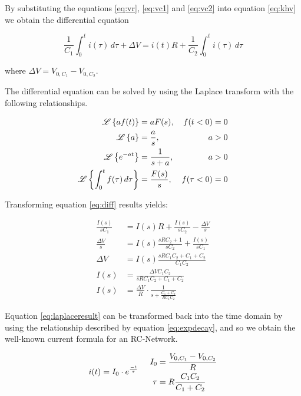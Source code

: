 By substituting the equations  \ref{eq:vr}, \ref{eq:vc1} and \ref{eq:vc2} into
equation \ref{eq:khv} we obtain the differential equation

\begin{equation}
    \frac{1}{C_1}\int_0^t i(\tau)\,d\tau + \Delta V = i(t)R + \frac{1}{C_2}\int_0^t i(\tau)\,d\tau
    \label{eq:diff}
\end{equation}

where $\Delta V = V_{0,C_1} - V_{0,C_2}$.

The differential  equation  can  be solved by using the Laplace transform with
the following relationships.

\begin{align}
    \mathscr{L}\left\{af(t)\right\} &= aF(s), & f(t<0)=0 \\
    \mathscr{L}\left\{a\right\} &= \frac{a}{s}, & a > 0 \\
    \mathscr{L}\left\{e^{-at}\right\} &= \frac{1}{s+a}, & a > 0 \label{eq:expdecay} \\
    \mathscr{L}\left\{\int_0^t f(\tau)\,d\tau\right\} &= \frac{F(s)}{s}, & f(\tau<0)=0
\end{align}

Transforming equation \ref{eq:diff} results yields:

\begin{align}
    \frac{I(s)}{sC_1} &= I(s)R + \frac{I(s)}{sC_2} - \frac{\Delta V}{s}\\
    \frac{\Delta V}{s} &= I(s)\frac{sRC_2 + 1}{sC_2} + \frac{I(s)}{sC_1} \\
    \Delta V &= I(s)\frac{sRC_1C_2 + C_1 + C_2}{C_1C_2} \\
    I(s) &= \frac{\Delta V C_1 C_2}{sRC_1C_2 + C_1 + C_2} \\
    I(s) &= \frac{\Delta V}{R}\cdot\frac{1}{s + \frac{C_1 + C_2}{RC_1C_2}} \label{eq:laplaceresult}
\end{align}

Equation \ref{eq:laplaceresult} can  be  transformed back into the time domain
by using the relationship described by  equation  \ref{eq:expdecay}, and so we
obtain the well-known current formula for an RC-Network.

\begin{equation}
    i(t) = I_0 \cdot e^{\frac{-t}{\tau}} \hspace{5mm} \begin{aligned}
        I_0  &= \frac{V_{0,C_1}-V_{0,C_2}}{R} \\
        \tau &= R \frac{C_1C_2}{C_1+C_2}
    \end{aligned}
    \label{eq:currentresult}
\end{equation}

